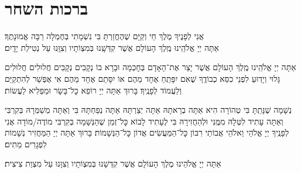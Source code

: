 \chapter[ברכות השחר]{ ברכות השחר }

אֲנִי לְפָנֶיךָ מֶלֶךְ חַי וְקַיָּם \middot שֶׁהֶחֱזַרְתָּ בִּי נִשְׁמָתִי בְּחֶמְלָה \middot רַבָּה אֱמוּנָתֶךָ׃\\
אַתָּה יְיָ אֱלֹהֵֽינוּ מֶֽלֶךְ הָעוֹלָם \middot אֲשֶׁר קִדְּשָֽׁנוּ בְּמִצְוֹתָיו וְצִוָּֽנוּ עַל נְטִילַת יָדָֽיִם׃

אַתָּה יְיָ אֱלֹהֵֽינוּ מֶֽלֶךְ הָעוֹלָם אֲשֶׁר יָצַר אֶת־הָאָדָם בְּחׇכְמָה וּבָרָא בוֹ נְקָבִים נְקָבִים חֲלוּלִים חֲלוּלִים \middot גָּלוּי וְיָדֽוּעַ לִפְנֵי כִסֵּא כְבוֹדֶֽךָ שֶׁאִם יִפָּתֵֽחַ אֶחָד מֵהֶם אוֹ יִסָּתֵם אֶחָד מֵהֶם אִי אֶפְשַׁר לְהִתְקַיֵּם וְלַעֲמוֹד לְפָנֶֽיךָ׃ בָּרוּךְ אַתָּה יְיָ רוֹפֵא כׇל־בָּשָׂר וּמַפְלִיא לַעֲשׂוֹת׃


נְשָׁמָה שֶׁנָּתַֽתָּ בִּי טְהוֹרָה הִיא \middot אַתָּה בְרָאתָהּ אַתָּה יְצַרְתָּהּ אַתָּה נְפַחְתָּהּ בִּי וְאַתָּה מְשַׁמְּרָהּ בְּקִרְבִּי וְאַתָּה עָתִיד לִטְּלָהּ מִמֶּֽנִּי וּלְהַחֲזִירָהּ בִּי לֶעָתִיד לָבוֹא \middot כׇּל־זְמַן שֶׁהַנְּשָׁמָה בְּקִרְבִּי מוֹדֶה/מוֹדָה אֲנִי לְפָנֶֽיךָ יְיָ אֱלֹהַי וֵאלֹהֵי אֲבוֹתַי רִבּוֹן כׇּל־הַמַּעֲשִׂים אֲדוֹן כׇּל־הַנְּשָׁמוֹת׃ בָּרוּךְ אַתָּה יְיָ הַמַּחֲזִיר נְשָׁמוֹת לִפְגָרִים מֵתִים׃

אַתָּה יְיָ אֱלֹהֵינוּ מֶלֶךְ הָעוֹלָם אֲשֶׁר קִדְּשָׁנוּ בְּמִצְוֹתָיו וְצִוָּנוּ עַל מִצְוַת צִיצִית׃

\newcommand{\birkothatorah}{
	בָּרוּךְ אַתָּה יְיָ אֱלֹהֵֽינוּ מֶֽלֶךְ הָעוֹלָם אֲשֶׁר קִדְּשָֽׁנוּ בְּמִצְוֹתָיו וְצִוָּֽנוּ לַעֲסוֹק בְּדִבְרֵי תוֹרָה׃ וְהַעֲרֶב־נָא יְיָ אֱלֹהֵֽינוּ אֶת־דִּבְרֵי תוֹרָתְךָ בְּפִֽינוּ וּבְפִיפִיּוֹת עַמְּךָ בֵּית יִשְׂרָאֵל \middot וְנִהְיֶה אֲנַֽחְנוּ וְצֶאֱצָאֵֽינוּ וְצֶאֱצָאֵי עַמְּךָ בֵּית יִשְׂרָאֵל כֻּלָּֽנוּ יוֹדְעֵי שְׁמֶֽךָ וְלוֹמְדֵי תוֹרָתֶֽךָ לִשְׁמָהּ׃ בָּרוּךְ אַתָּה יְיָ הַמְלַמֵּד תּוֹרָה לְעַמּוֹ יִשְׂרָאֵל׃
	
	בָּרוּךְ אַתָּה יְיָ אֱלֹהֵֽינוּ מֶֽלֶךְ הָעוֹלָם אֲשֶׁר בָּֽחַר־בָּֽנוּ מִכׇּל־הָעַמִּים וְנָֽתַן־לָֽנוּ אֶת־תּוֹרָתוֹ׃ בָּרוּךְ אַתָּה יְיָ נוֹתֵן הַתּוֹרָה׃\\}

